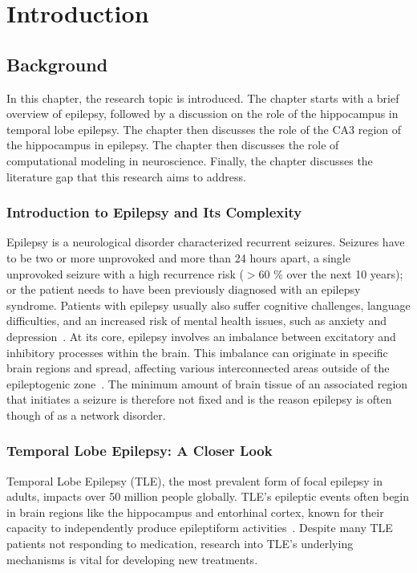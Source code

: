\chapter{Introduction}


\section{Background}
In this chapter, the research topic is introduced. 
The chapter starts with a brief overview of epilepsy, followed by a discussion on the role of the hippocampus in temporal lobe epilepsy. 
The chapter then discusses the role of the CA3 region of the hippocampus in epilepsy. 
The chapter then discusses the role of computational modeling in neuroscience. 
Finally, the chapter discusses the literature gap that this research aims to address.

\subsection{Introduction to Epilepsy and Its Complexity}
Epilepsy is a neurological disorder characterized recurrent seizures. 
Seizures have to be two or more unprovoked and more than 24 hours apart, a single unprovoked
seizure with a high recurrence risk (\(>\)60 \% over the next 10 years); or the patient needs to have been previously diagnosed with an epilepsy syndrome.
Patients with epilepsy usually also suffer cognitive challenges, language difficulties, and an increased risk of mental health issues, 
such as anxiety and depression~\parencite{fisherILAEOfficialReport2014}. At its core, epilepsy 
involves an imbalance between excitatory and inhibitory processes within the brain. 
This imbalance can originate in specific brain regions and spread, affecting various interconnected areas 
outside of the epileptogenic zone~\parencite{ludersEpileptogenicZoneGeneral2006}.
The minimum amount of brain tissue of an associated region that initiates a seizure is therefore not fixed and is the 
reason epilepsy is often though of as a network disorder.

\subsection{Temporal Lobe Epilepsy: A Closer Look}
Temporal Lobe Epilepsy (TLE), the most prevalent form of focal epilepsy in adults, 
impacts over 50 million people globally. TLE's epileptic events often begin in 
brain regions like the hippocampus and entorhinal cortex, known for their 
capacity to independently produce epileptiform activities~\parencite{lyttonComputerSimulationEpilepsy2005}.
Despite many TLE patients not responding to medication, research into TLE's 
underlying mechanisms is vital for developing new treatments.

